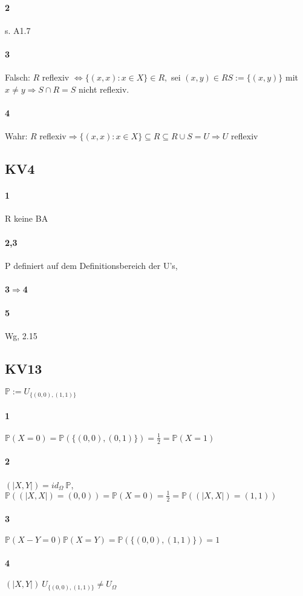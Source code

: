 \documentclass[10pt, a4paper]{article}
\begin{document}
\paragraph{2}s. A1.7
\paragraph{3}Falsch: $R$ reflexiv $\Leftrightarrow\{(x,x):x\in X\}\in R,$ sei $(x,y)\in R S:=\{(x,y) \}$ mit $x\neq y\Rightarrow S\cap R=S$ nicht reflexiv.
\paragraph{4}Wahr: $R$ reflexiv$\Rightarrow\{(x,x):x\in X \}\subseteq R \subseteq R\cup S=U \Rightarrow U$ reflexiv

\subsection{KV4}
\paragraph{1}R keine BA
\paragraph{2,3}P definiert auf dem Definitionsbereich der U's,
\paragraph{3$\Rightarrow$4}
\paragraph{5}Wg, 2.15


\subsection{KV13}
$\mathbb{P}:=U_{\{(0,0),(1,1)\}}$
\paragraph{1}$\mathbb{P}(X=0)=\mathbb{P}(\{(0,0),(0,1)\})=\frac{1}{2}=\mathbb{P}(X=1)$
\paragraph{2}$(|X,Y|)=id_{\Omega}~\mathbb{P}$, $\mathbb{P}((|X,X|)=(0,0))=\mathbb{P}(X=0)=\frac{1}{2}=\mathbb{P}((|X,X|)=(1,1))$
\paragraph{3}$\mathbb{P}(X-Y=0)\mathbb{P}(X=Y)=\mathbb{P}(\{(0,0),(1,1)\})=1 $
\paragraph{4}$(|X,Y|)~U_{\{(0,0),(1,1)\}}\neq U_{\Omega}$
\end{document}
